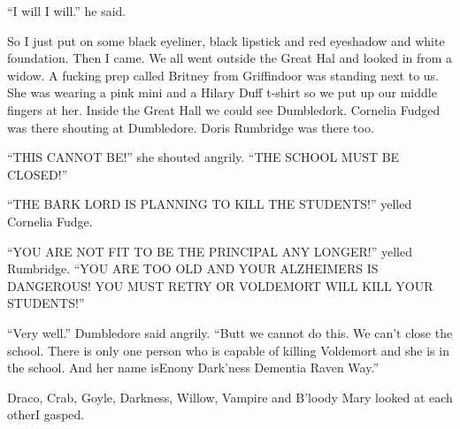 \enquote{I will I will.} he said.

So I just put on some black eyeliner, black lipstick and red eyeshadow and white foundation. Then I came. We all went outside the Great Hal and looked in from a widow. A fucking prep called Britney from Griffindoor was standing next to us. She was wearing a pink mini and a Hilary Duff t-shirt so we put up our middle fingers at her. Inside the Great Hall we could see Dumbledork. Cornelia Fudged was there shouting at Dumbledore. Doris Rumbridge was there too.

\enquote{THIS CANNOT BE\@!} she shouted angrily. \enquote{THE SCHOOL MUST BE CLOSED\@!}

\enquote{THE BARK LORD IS PLANNING TO KILL THE STUDENTS\@!} yelled Cornelia Fudge.

\begin{sloppypar}
    \enquote{YOU ARE NOT FIT TO BE THE PRINCIPAL ANY LONGER\@!} yelled Rumbridge. \enquote{YOU ARE TOO OLD AND YOUR ALZ\-HEIMERS IS DANGEROUS\@! YOU MUST RETRY OR VOL\-DE\-MORT WILL KILL YOUR STUDENTS\@!}
\end{sloppypar}

\enquote{Very well.} Dumbledore said angrily. \enquote{Butt we cannot do this. We can't close the school. There is only one person who is capable of killing Voldemort and she is in the school. And her name is\dotfill\newline\phantom{}\dotfill Enony Dark'ness Dementia Raven Way.} 

Draco, Crab, Goyle, Darkness, Willow, Vampire and B'loody Mary looked at each other\dotfill I gasped.


